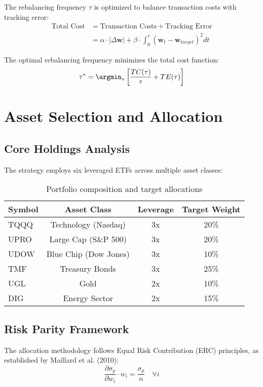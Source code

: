\documentclass[onecolumn,ieee]{arithmaxresearch}
\begin{document}
The rebalancing frequency $\tau$ is optimized to balance transaction costs with tracking error:
\begin{align}
\text{Total Cost} &= \text{Transaction Costs} + \text{Tracking Error} \\
&= \alpha \cdot |\Delta \mathbf{w}| + \beta \cdot \int_0^\tau (\mathbf{w}_t - \mathbf{w}_{target})^2 dt
\end{align}

The optimal rebalancing frequency minimizes the total cost function:
\begin{equation}
\tau^* = \argmin_\tau \left[ \frac{TC(\tau)}{\tau} + TE(\tau) \right]
\end{equation}

\section{Asset Selection and Allocation}

\subsection{Core Holdings Analysis}

The strategy employs six leveraged ETFs across multiple asset classes:

\begin{table}[h]
\centering
\begin{tabular}{lccc}
\toprule
Symbol & Asset Class & Leverage & Target Weight \\
\midrule
TQQQ & Technology (Nasdaq) & 3x & 20\% \\
UPRO & Large Cap (S\&P 500) & 3x & 20\% \\
UDOW & Blue Chip (Dow Jones) & 3x & 10\% \\
TMF & Treasury Bonds & 3x & 25\% \\
UGL & Gold & 2x & 10\% \\
DIG & Energy Sector & 2x & 15\% \\
\bottomrule
\end{tabular}
\caption{Portfolio composition and target allocations}
\end{table}

\subsection{Risk Parity Framework}

The allocation methodology follows Equal Risk Contribution (ERC) principles, as established by Maillard et al. (2010):
\begin{equation}
\frac{\partial \sigma_p}{\partial w_i} \cdot w_i = \frac{\sigma_p}{n} \quad \forall i
\end{equation}
\end{document}
